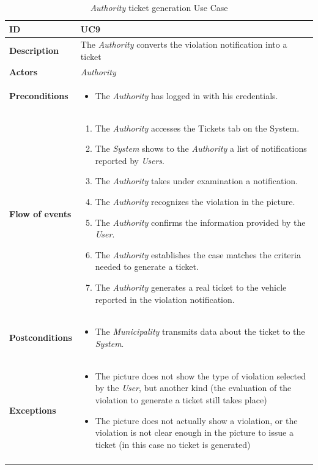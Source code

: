 \documentclass {article}
\begin{document}
	\begin{longtable}{| p{3 cm} | p{10.5 cm} |} 
			\hline
			{\bf ID} & UC9 \\
			\hline
			{\bf Description} & The {\it Authority} converts the violation notification into a ticket \\
			\hline
			{\bf Actors} & {\it Authority}\\
			\hline
			{\bf Preconditions} & \begin{itemize}
								  \item The {\it Authority} has logged in with his credentials.
								  
								  \end{itemize}	\\
			\hline
			{\bf Flow of events} &	\begin{enumerate}
								  \item The {\it Authority} accesses the Tickets tab on the System.
								  \item The {\it System} shows to the {\it Authority} a list of notifications reported by {\it Users}.
								  \item The {\it Authority} takes under examination a notification.
								  \item The {\it Authority} recognizes the violation in the picture.
								  \item The {\it Authority} confirms the information provided by the {\it User}.
								  \item The {\it Authority} establishes the case matches the criteria needed to generate a ticket.
								  \item The {\it Authority} generates a real ticket to the vehicle reported in the violation notification.
								  \end{enumerate}	\\
			\hline
			{\bf Postconditions} & \begin{itemize}
								  \item The {\it Municipality} transmits data about the ticket to the {\it System}.
								  \end{itemize}	 \\
			\hline
			{\bf Exceptions} & 	\begin{itemize}
								  \item The picture does not show the type of violation selected by the {\it User}, but another kind (the evaluation of the violation to generate a ticket still takes place)
								  \item The picture does not actually show a violation, or the violation is not clear enough in the picture to issue a ticket (in this case no ticket is generated)
								  \end{itemize}	\\
			\hline
			\caption{{\it Authority} ticket generation Use Case}
			\end{longtable}
			
\end{document}
